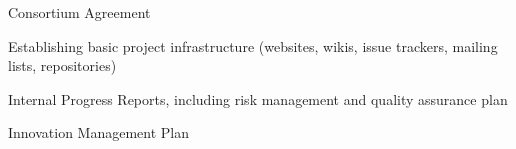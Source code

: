 \begin{workpackage}
%


\begin{wpdelivs}
\begin{wpdeliv}[due=1,id=ca,dissem=CO,nature=R]{Consortium Agreement}
\end{wpdeliv}

\begin{wpdeliv}[due=1,id=tickets,dissem=PU,nature=DEC]{Establishing basic project infrastructure 
    (websites, wikis, issue trackers, mailing lists, repositories)}
\end{wpdeliv}

\begin{wpdeliv}[due=12, 36,id=ipr,dissem=CO,nature=R]{Internal Progress Reports, including risk management and quality assurance plan}
\end{wpdeliv}

\begin{wpdeliv}[due=18, 45,id=tickets,dissem=CO,nature=R]{Innovation Management Plan}
\end{wpdeliv}



\end{wpdelivs}
\end{workpackage}

